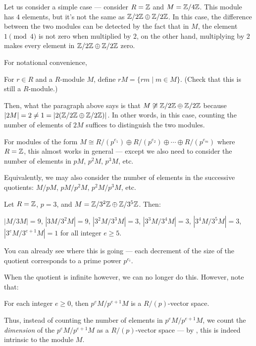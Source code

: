 Let us consider a simple case --- consider $R = \mathbb Z$ and $M = \mathbb Z/4\mathbb Z$. This module has $4$ elements, but
it's not the same as $\mathbb Z/2\mathbb Z \oplus \mathbb Z/2\mathbb Z$. In this case, the difference between the two modules can be
detected by the fact that in $M$, the element $1 \pmod 4$ is not zero when multiplied by $2$, on the
other hand, multiplying by $2$ makes every element in $\mathbb Z/2\mathbb Z \oplus \mathbb Z/2\mathbb Z$ zero.

For notational convenience,
\begin{definition}
	For $r \in R$ and a $R$-module $M$, define $r M = \{ r m \mid m \in M \}$. (Check that this is still
	a $R$-module.)
\end{definition}

Then, what the paragraph above says is that $M \not\cong \mathbb Z/2\mathbb Z \oplus \mathbb Z/2\mathbb Z$ because $|2 M| = 2 \neq 1
= |2 (\mathbb Z/2\mathbb Z \oplus \mathbb Z/2\mathbb Z)|$.
In other words, in this case, counting the number of elements of $2M$ suffices to distinguish the two
modules.

For modules of the form
$M \cong R/(p^{e_1}) \oplus R/(p^{e_2}) \oplus \cdots \oplus R/(p^{e_m})$ where $R = \mathbb Z$,
this almost works in general --- except we also need to consider the number of elements in
$p M$, $p^2 M$, $p^3 M$, etc.

Equivalently, we may also consider the number of elements in the successive quotients:
$M/pM$, $pM/p^2 M$, $p^2 M/p^3 M$, etc.
\begin{example}
	Let $R = \mathbb Z$, $p = 3$, and $M = \mathbb Z/3^2\mathbb Z \oplus \mathbb Z/3^5\mathbb Z$. Then:
	\begin{itemize}
		\ii $|M/3M| = 9$,
		\ii $|3M/3^2 M| = 9$,
		\ii $|3^2 M/3^3 M| = 3$,
		\ii $|3^3 M/3^4 M| = 3$,
		\ii $|3^4 M/3^5 M| = 3$,
		\ii $|3^e M/3^{e+1} M| = 1$ for all integer $e \geq 5$.
	\end{itemize}
	You can already see where this is going --- each decrement of the size of the quotient
	corresponds to a prime power $p^{e_i}$.
\end{example}

When the quotient is infinite however, we can no longer do this. However, note that:
\begin{lemma}
	For each integer $e \geq 0$, then $p^e M/p^{e+1} M$ is a $R/(p)$-vector space.
\end{lemma}
Thus, instead of counting the number of elements in $p^e M/p^{e+1} M$, we count the \emph{dimension} of
the $p^e M/p^{e+1} M$ as a $R/(p)$-vector space --- by , this is indeed
intrinsic to the module $M$.

